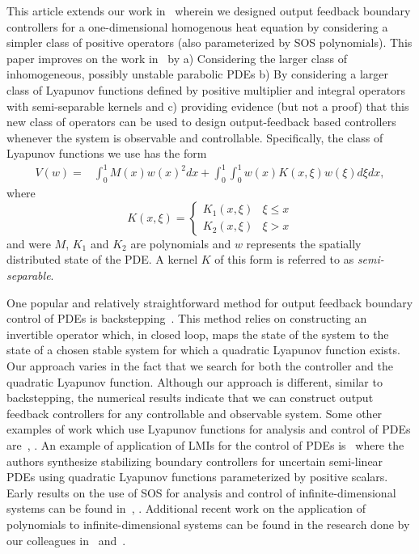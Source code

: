 \documentclass[US letter, 9 pt, conference]{ieeeconf}  \usepackage{setspace}
\newcommand{\igzo}{\int_0^1}
\begin{document}
This article extends our work in~\cite{gahlawat2011designing} wherein we designed output feedback boundary controllers for a one-dimensional homogenous heat equation by considering a simpler class of positive operators (also parameterized by SOS polynomials). This paper improves on the work in~\cite{gahlawat2011designing} by a) Considering the larger class of inhomogeneous, possibly unstable parabolic PDEs b) By considering a larger class of Lyapunov functions defined by positive multiplier and integral operators with semi-separable kernels and c) providing evidence (but not a proof) that this new class of operators can be used to design output-feedback based controllers whenever the system is observable and controllable. Specifically, the class of Lyapunov functions we use has the form
\begin{align*}
V(w)=&\igzo M(x)w(x)^2dx+\igzo\igzo w(x)K(x,\xi)w(\xi)d\xi dx,
\end{align*} where
\[K(x,\xi) = \begin{cases} K_1(x,\xi) & \xi \leq x \\
K_2(x,\xi) &  \xi>x \end{cases} \]
and were $M$, $K_1$ and $K_2$ are polynomials and $w$ represents the spatially distributed state of the PDE. A kernel $K$ of this form is referred to as \textit{semi-separable}.

One popular and relatively straightforward method for output feedback boundary control of PDEs is backstepping~\cite{krstic2008boundary}. This method relies on constructing an invertible operator which, in closed loop, maps the state of the system to the state of a chosen stable system for which a quadratic Lyapunov function exists. Our approach varies in the fact that we search for both the controller and the quadratic Lyapunov function. Although our approach is different, similar to backstepping, the numerical results indicate that we can construct output feedback controllers for any controllable and observable system. Some other examples of work which use Lyapunov functions for analysis and control of PDEs are~\cite{coron2008dissipative}, \cite{coron2007strict}. An example of application of LMIs for the control of PDEs is~\cite{fridman2009lmi} where the authors synthesize stabilizing boundary controllers for uncertain semi-linear PDEs using quadratic Lyapunov functions parameterized by positive scalars. Early results on the use of SOS for analysis and control of infinite-dimensional systems can be found in~\cite{peet2006positive}, \cite{papachristodoulou2006analysis}. Additional recent work on the application of polynomials to infinite-dimensional systems can be found in the research done by our colleagues in~\cite{Valmo_1} and~\cite{Valmo_2}.
\end{document}
